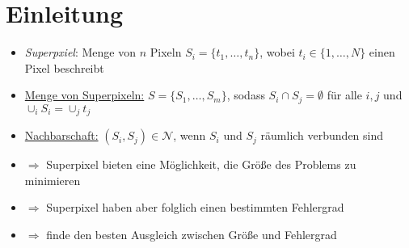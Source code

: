 \section{Einleitung}

\begin{itemize}
  \item \emph{Superpxiel}: Menge von $n$ Pixeln $S_i = \lbrace t_1, \ldots, t_n \rbrace$, wobei $t_i \in \lbrace 1, \ldots, N \rbrace$ einen Pixel beschreibt
  \item \underline{Menge von Superpixeln:} $S = \lbrace S_1, \ldots, S_m \rbrace$, sodass $S_i \cap S_j = \emptyset$ für alle $i, j$ und $\cup_i S_i = \cup_j t_j$
  \item \underline{Nachbarschaft:} $(S_i, S_j) \in \mathcal{N}$, wenn $S_i$ und $S_j$ räumlich verbunden sind
  \item $\Rightarrow$ Superpixel bieten eine Möglichkeit, die Größe des Problems zu minimieren
  \item $\Rightarrow$ Superpixel haben aber folglich einen bestimmten Fehlergrad
  \item $\Rightarrow$ finde den besten Ausgleich zwischen Größe und Fehlergrad
\end{itemize}
